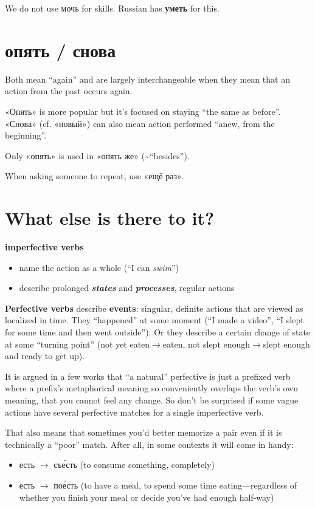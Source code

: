 We do not use мочь for skills. Russian has \textbf{уметь} for this.

\section{опять /
снова}\label{ux43eux43fux44fux442ux44c-ux441ux43dux43eux432ux430}

Both mean ``again'' and are largely interchangeable when they mean that
an action from the past occurs again.

«Опять» is more popular but it's focused on staying ``the same as
before''. «Снова» (cf. «новый») can also mean action performed ``anew,
from the beginning''.

Only «опять» is used in «опять же» (\textasciitilde{}``besides'').

When asking someone to repeat, use «ещё раз».

\section{What else is there to
it?}\label{what-else-is-there-to-it}

\textbf{imperfective verbs}

\begin{itemize}
\tightlist
\item
  name the action as a whole (``I can \emph{swim}'')
\item
  describe prolonged \textbf{\emph{states}} and
  \textbf{\emph{processes}}, regular actions
\end{itemize}

\textbf{Perfective verbs} describe \textbf{events}: singular, definite
actions that are viewed as localized in time. They ``happened'' at some
moment (``I made a video'', ``I slept for some time and then went
outside''). Or they describe a certain change of state at some ``turning
point'' (not yet eaten$ \rightarrow$eaten, not slept enough$ \rightarrow$slept enough and ready to
get up).

It is argued in a few works that ``a natural'' perfective is just a
prefixed verb where a prefix's metaphorical meaning so conveniently
overlaps the verb's own meaning, that you cannot feel any change. So
don't be surprised if some vague actions have several perfective matches
for a single imperfective verb.

That also means that sometimes you'd better memorize a pair even if it
is technically a ``poor'' match. After all, in some contexts it will
come in handy:

\begin{itemize}
\tightlist
\item
  есть $ \rightarrow$ съ\'{е}сть (to consume something, completely)
\item
  есть $ \rightarrow$ по\'{е}сть (to have a meal, to spend some time eating---regardless
  of whether you finish your meal or decide you've had enough half-way)
\end{itemize}

